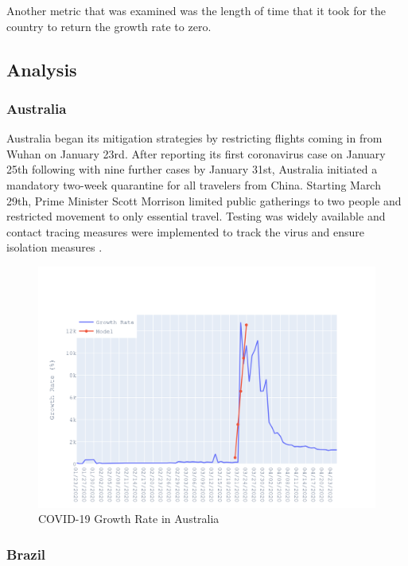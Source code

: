 \documentclass{homework}
\begin{document}
Another metric that was examined was the length of time that it took for the country to return the growth rate to zero.

\newpage
\subsection{Analysis}

\subsubsection{Australia}

Australia began its mitigation strategies by restricting flights coming in from Wuhan on January 23rd. After reporting its first coronavirus case on January 25th following with nine further cases by January 31st, Australia initiated a mandatory two-week quarantine for all travelers from China. Starting March 29th, Prime Minister Scott Morrison limited public gatherings to two people and restricted movement to only essential travel. Testing was widely available and contact tracing measures were implemented to track the virus and ensure isolation measures \cite{perper_2020}.

\begin{figure}[H]
  \centering
  \includegraphics[scale=0.3]{task3/Australia.png}
  \caption{COVID-19 Growth Rate in Australia}
\end{figure}

\newpage
\subsubsection{Brazil}
\end{document}
